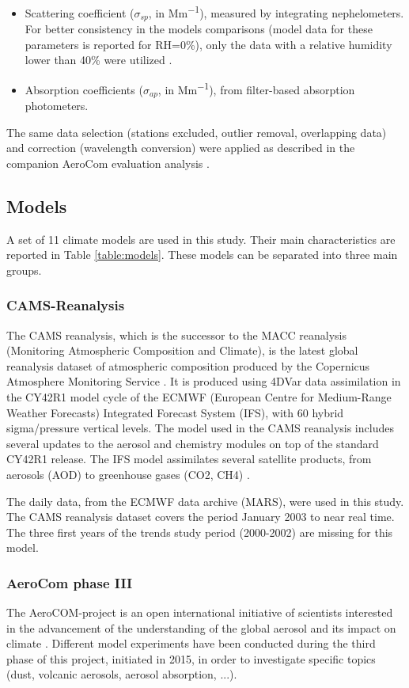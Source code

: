 \documentclass[journal abbreviation, manuscript]{copernicus}
\begin{document}
\begin{itemize}
 \item Scattering coefficient ($\sigma_{sp}$, in \unit{Mm^{-1}}), measured by integrating nephelometers. For better consistency in the models comparisons (model data for these parameters is reported for RH=0\%), only the data with a relative humidity lower than 40\% were utilized \citep{pandolfi2018european}.
 \item Absorption coefficients ($\sigma_{ap}$, in \unit{Mm^{-1}}), from filter-based absorption photometers.
\end{itemize}

The same data selection (stations excluded, outlier removal, overlapping data) and correction (wavelength conversion) were applied as described in the companion AeroCom evaluation analysis \citep{jonaseval}.

\subsection{Models}
A set of 11 climate models are used in this study. Their main characteristics are reported in Table \ref{table:models}. These models can be separated into three main groups.

\subsubsection{CAMS-Reanalysis}
The CAMS reanalysis, which is the successor to the MACC reanalysis (Monitoring Atmospheric Composition and Climate), is the latest global reanalysis dataset of atmospheric composition produced by the Copernicus Atmosphere Monitoring Service \citep{inness2019cams}. It is produced using 4DVar data assimilation in the CY42R1 model cycle of the ECMWF (European Centre for Medium-Range Weather Forecasts) Integrated Forecast System (IFS), with 60 hybrid sigma/pressure vertical levels. The model used in the CAMS reanalysis includes several updates to the aerosol and chemistry modules on top of the standard CY42R1 release. The IFS model assimilates several satellite products, from aerosols (AOD) to greenhouse gases (CO2, CH4) \cite{inness2019cams}.

The daily data, from the ECMWF data archive (MARS), were used in this study. The CAMS reanalysis dataset covers the period January 2003 to near real time. The three first years of the trends study period (2000-2002) are missing for this model.

\subsubsection{AeroCom phase III}
The AeroCOM-project is an open international initiative of scientists interested in the advancement of the understanding of the global aerosol and its impact on climate \citep{schulz2006radiative}. Different model experiments have been conducted during the third phase of this project, initiated in 2015, in order to investigate specific topics (dust, volcanic aerosols, aerosol absorption, ...). 
\end{document}
